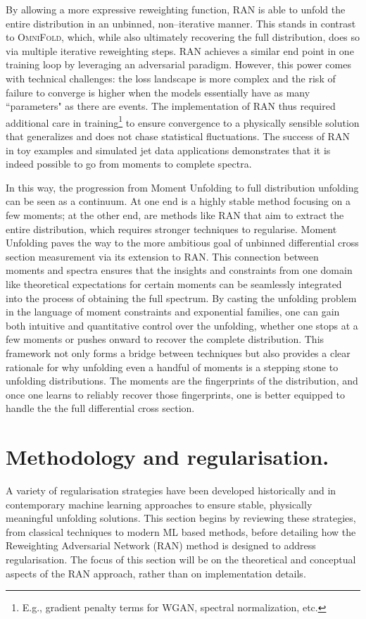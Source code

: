 {{        By allowing a more expressive reweighting function, RAN is able to unfold the entire distribution in an unbinned, non--iterative manner.
        This stands in contrast to \textsc{OmniFold}, which, while also ultimately recovering the full distribution, does so via multiple iterative reweighting steps.
        RAN achieves a similar end point in one training loop by leveraging an adversarial paradigm.
        However, this power comes with technical challenges: the loss landscape is more complex and the risk of failure to converge is higher when the models essentially have as many ``parameters" as there are events.
        The implementation of RAN thus required additional care in training\footnote{E.g., gradient penalty terms for WGAN, spectral normalization, etc.} to ensure convergence to a physically sensible solution that generalizes and does not chase statistical fluctuations.
        The success of RAN in toy examples and simulated jet data applications demonstrates that it is indeed possible to go from moments to complete spectra.

In this way, the progression from Moment Unfolding to full distribution unfolding can be seen as a continuum.
%
At one end is a highly stable method focusing on a few moments; at the other end, are methods like RAN that aim to extract the entire distribution, which requires stronger techniques to regularise.
%
Moment Unfolding paves the way to the more ambitious goal of unbinned differential cross section measurement via its extension to RAN.
%
This connection between moments and spectra ensures that the insights and constraints from one domain like theoretical expectations for certain moments can be seamlessly integrated into the process of obtaining the full spectrum.
%
By casting the unfolding problem in the language of moment constraints and exponential families, one can gain both intuitive and quantitative control over the unfolding, whether one stops at a few moments or pushes onward to recover the complete distribution.
%
This framework not only forms a bridge between techniques but also provides a clear rationale for why unfolding even a handful of moments is a stepping stone to unfolding distributions.
%
The moments are the fingerprints of the distribution, and once one learns to reliably recover those fingerprints, one is better equipped to handle the the full differential cross section.

\section{Methodology and regularisation.}
    A variety of regularisation strategies have been developed historically and in contemporary machine learning approaches to ensure stable, physically meaningful unfolding solutions.
    This section begins by reviewing these strategies, from classical techniques to modern ML based methods, before detailing how the Reweighting Adversarial Network (RAN) method is designed to address regularisation.
    The focus of this section will be on the theoretical and conceptual aspects of the RAN approach, rather than on implementation details.

}}
